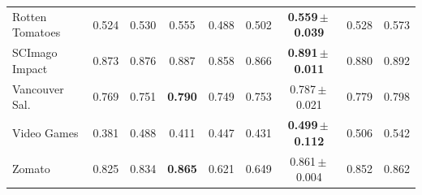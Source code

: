 \begin{tabular}{@{}lcccccccc@{}}
Rotten Tomatoes & 0.524 & 0.530 & 0.555 & 0.488 & 0.502 & \textbf{0.559\,$\pm$\,0.039} & 0.528 & 0.573 \\
SCImago Impact & 0.873 & 0.876 & 0.887 & 0.858 & 0.866 & \textbf{0.891\,$\pm$\,0.011} & 0.880 & 0.892 \\
Vancouver Sal. & 0.769 & 0.751 & \textbf{0.790} & 0.749 & 0.753 & 0.787\,$\pm$\,0.021 & 0.779 & 0.798 \\
Video Games & 0.381 & 0.488 & 0.411 & 0.447 & 0.431 & \textbf{0.499\,$\pm$\,0.112} & 0.506 & 0.542 \\
Zomato & 0.825 & 0.834 & \textbf{0.865} & 0.621 & 0.649 & 0.861\,$\pm$\,0.004 & 0.852 & 0.862 \\
\bottomrule
\end{tabular}
